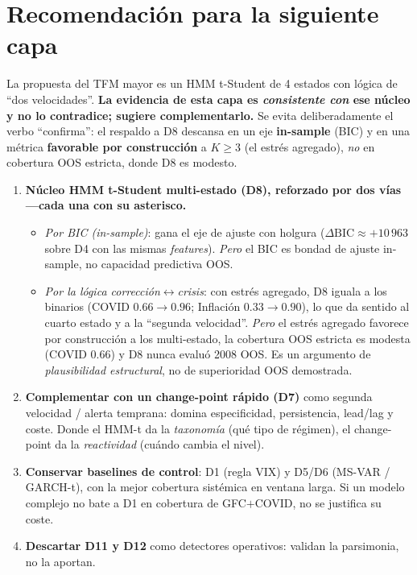 \documentclass[11pt,a4paper]{article}
\begin{document}
\section{Recomendaci\'on para la siguiente capa}
\label{sec:reco}

La propuesta del TFM mayor es un HMM t-Student de 4 estados con l\'ogica de ``dos
velocidades''. \textbf{La evidencia de esta capa es \emph{consistente con} ese n\'ucleo y no
lo contradice; sugiere complementarlo.} Se evita deliberadamente el verbo ``confirma'': el
respaldo a D8 descansa en un eje \textbf{in-sample} (BIC) y en una m\'etrica
\textbf{favorable por construcci\'on} a $K\ge3$ (el estr\'es agregado), \emph{no} en
cobertura OOS estricta, donde D8 es modesto.

\begin{enumerate}[leftmargin=1.4em]
  \item \textbf{N\'ucleo HMM t-Student multi-estado (D8), reforzado por dos v\'ias ---cada
  una con su asterisco.}
    \begin{itemize}
      \item \emph{Por BIC (in-sample)}: gana el eje de ajuste con holgura
      ($\Delta\mathrm{BIC}\approx{+}10\,963$ sobre D4 con las mismas \emph{features}).
      \emph{Pero} el BIC es bondad de ajuste in-sample, no capacidad predictiva OOS.
      \item \emph{Por la l\'ogica correcci\'on$\leftrightarrow$crisis}: con estr\'es
      agregado, D8 iguala a los binarios (COVID $0.66\to0.96$; Inflaci\'on $0.33\to0.90$),
      lo que da sentido al cuarto estado y a la ``segunda velocidad''. \emph{Pero} el
      estr\'es agregado favorece por construcci\'on a los multi-estado, la cobertura OOS
      estricta es modesta (COVID $0.66$) y D8 nunca evalu\'o 2008 OOS. Es un argumento de
      \emph{plausibilidad estructural}, no de superioridad OOS demostrada.
    \end{itemize}
  \item \textbf{Complementar con un change-point r\'apido (D7)} como segunda velocidad /
  alerta temprana: domina especificidad, persistencia, lead/lag y coste. Donde el HMM-t da
  la \emph{taxonom\'ia} (qu\'e tipo de r\'egimen), el change-point da la \emph{reactividad}
  (cu\'ando cambia el nivel).
  \item \textbf{Conservar baselines de control}: D1 (regla VIX) y D5/D6 (MS-VAR / GARCH-t),
  con la mejor cobertura sist\'emica en ventana larga. Si un modelo complejo no bate a D1 en
  cobertura de GFC$+$COVID, no se justifica su coste.
  \item \textbf{Descartar D11 y D12} como detectores operativos: validan la parsimonia, no
  la aportan.
\end{enumerate}
\end{document}
